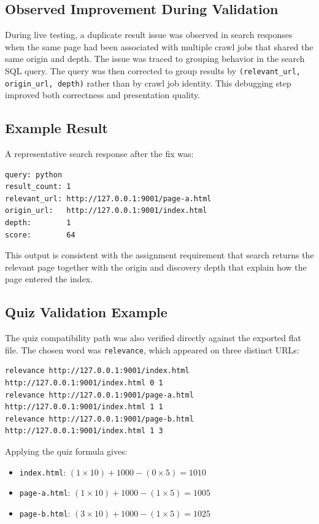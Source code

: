 \documentclass[pdftex,12pt,a4paper]{article}
\begin{document}
\subsection{Observed Improvement During Validation}

During live testing, a duplicate result issue was observed in search responses when the same page had been associated with multiple crawl jobs that shared the same origin and depth. The issue was traced to grouping behavior in the search SQL query. The query was then corrected to group results by \texttt{(relevant\_url, origin\_url, depth)} rather than by crawl job identity. This debugging step improved both correctness and presentation quality.

\subsection{Example Result}

A representative search response after the fix was:

\begin{Verbatim}[fontsize=\small]
query: python
result_count: 1
relevant_url: http://127.0.0.1:9001/page-a.html
origin_url:   http://127.0.0.1:9001/index.html
depth:        1
score:        64
\end{Verbatim}

This output is consistent with the assignment requirement that search returns the relevant page together with the origin and discovery depth that explain how the page entered the index.

\subsection{Quiz Validation Example}

The quiz compatibility path was also verified directly against the exported flat file. The chosen word was \texttt{relevance}, which appeared on three distinct URLs:

\begin{Verbatim}[fontsize=\small]
relevance http://127.0.0.1:9001/index.html  http://127.0.0.1:9001/index.html 0 1
relevance http://127.0.0.1:9001/page-a.html http://127.0.0.1:9001/index.html 1 1
relevance http://127.0.0.1:9001/page-b.html http://127.0.0.1:9001/index.html 1 3
\end{Verbatim}

Applying the quiz formula gives:

\begin{itemize}
    \item \texttt{index.html}: $(1 \times 10) + 1000 - (0 \times 5) = 1010$
    \item \texttt{page-a.html}: $(1 \times 10) + 1000 - (1 \times 5) = 1005$
    \item \texttt{page-b.html}: $(3 \times 10) + 1000 - (1 \times 5) = 1025$
\end{itemize}
\end{document}
